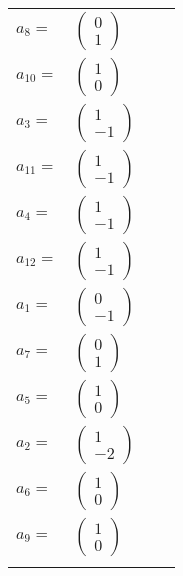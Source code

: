 \documentclass[1p]{elsarticle_modified}
\theoremstyle{definition}
\begin{document}
\begin{tabular}{m{7pt} m{180pt} m{7pt} m{180pt} }
\flushright $a_{8}=$&$\begin{pmatrix}0\\1\end{pmatrix}$ \\
\flushright $a_{10}=$&$\begin{pmatrix}1\\0\end{pmatrix}$ \\
\flushright $a_{3}=$&$\begin{pmatrix}1\\-1\end{pmatrix}$ \\
\flushright $a_{11}=$&$\begin{pmatrix}1\\-1\end{pmatrix}$ \\
\flushright $a_{4}=$&$\begin{pmatrix}1\\-1\end{pmatrix}$ \\
\flushright $a_{12}=$&$\begin{pmatrix}1\\-1\end{pmatrix}$ \\
\flushright $a_{1}=$&$\begin{pmatrix}0\\-1\end{pmatrix}$ \\
\flushright $a_{7}=$&$\begin{pmatrix}0\\1\end{pmatrix}$ \\
\flushright $a_{5}=$&$\begin{pmatrix}1\\0\end{pmatrix}$ \\
\flushright $a_{2}=$&$\begin{pmatrix}1\\-2\end{pmatrix}$ \\
\flushright $a_{6}=$&$\begin{pmatrix}1\\0\end{pmatrix}$ \\
\flushright $a_{9}=$&$\begin{pmatrix}1\\0\end{pmatrix}$\\&\end{tabular}
\end{document}
